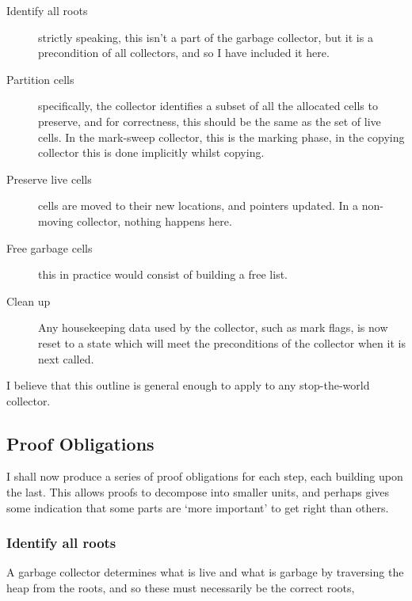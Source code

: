 \begin{description}
  \item[Identify all roots] strictly speaking, this isn't a part of
    the garbage collector, but it is a precondition of all collectors,
    and so I have included it here.

  \item[Partition cells] specifically, the collector identifies a
    subset of all the allocated cells to preserve, and for
    correctness, this should be the same as the set of live cells. In
    the mark-sweep collector, this is the marking phase, in the
    copying collector this is done implicitly whilst copying.

  \item[Preserve live cells] cells are moved to their new locations,
    and pointers updated. In a non-moving collector, nothing happens
    here.

  \item[Free garbage cells] this in practice would consist of building
    a free list.

  \item[Clean up] Any housekeeping data used by the collector, such as
    mark flags, is now reset to a state which will meet the
    preconditions of the collector when it is next called.
\end{description}

I believe that this outline is general enough to apply to any
stop-the-world collector.

\subsection{Proof Obligations}
\label{sec:gc-framework-obligations}

I shall now produce a series of proof obligations for each step, each
building upon the last. This allows proofs to decompose into smaller
units, and perhaps gives some indication that some parts are `more
important' to get right than others.

\subsubsection{Identify all roots}
\label{sec:gc-framework-obligations-roots}

A garbage collector determines what is live and what is garbage by
traversing the heap from the roots, and so these must necessarily be
the correct roots,


